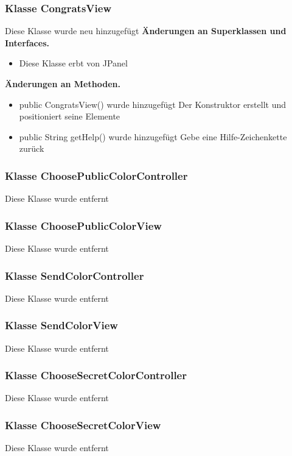 \documentclass{article}
\begin{document}
	\subsubsection{Klasse CongratsView}
    Diese Klasse wurde neu hinzugefügt
	    \textbf{Änderungen an Superklassen und Interfaces.}\newline
        \begin{itemize}
            \item Diese Klasse erbt von JPanel \newline
           \end{itemize}
    \textbf{Änderungen an Methoden.}\newline
	   \begin{itemize}
           \item public CongratsView() wurde hinzugefügt
               Der Konstruktor erstellt und positioniert seine Elemente
           \item public String getHelp() wurde hinzugefügt
               Gebe eine Hilfe-Zeichenkette zurück
           \end{itemize}

	\subsubsection{Klasse ChoosePublicColorController}
    Diese Klasse wurde entfernt

	\subsubsection{Klasse ChoosePublicColorView}
    Diese Klasse wurde entfernt

	\subsubsection{Klasse SendColorController}
    Diese Klasse wurde entfernt

	\subsubsection{Klasse SendColorView}
    Diese Klasse wurde entfernt

	\subsubsection{Klasse ChooseSecretColorController}
    Diese Klasse wurde entfernt

	\subsubsection{Klasse ChooseSecretColorView}
    Diese Klasse wurde entfernt
\end{document}
